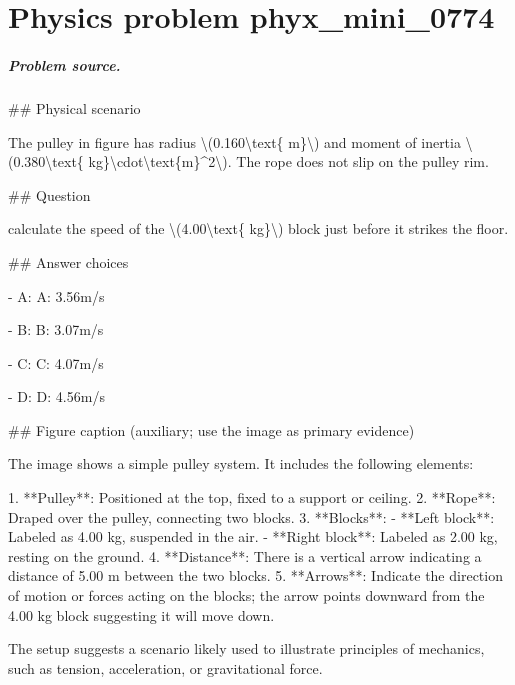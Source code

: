 
\chapter{Physics problem phyx\_mini\_0774}
\label{ch:PhyXMiniProblems_problem_phyx_mini_0774}

\paragraph{Problem source.}
\#\# Physical scenario

The pulley in figure has radius \textbackslash{}(0.160\textbackslash{}text\{ m\}\textbackslash{}) and moment of inertia \textbackslash{}(0.380\textbackslash{}text\{ kg\}\textbackslash{}cdot\textbackslash{}text\{m\}\textasciicircum{}2\textbackslash{}). The rope does not slip on the pulley rim.

\#\# Question

calculate the speed of the \textbackslash{}(4.00\textbackslash{}text\{ kg\}\textbackslash{}) block just before it strikes the floor.

\#\# Answer choices

- A: A: 3.56m/s

- B: B: 3.07m/s

- C: C: 4.07m/s

- D: D: 4.56m/s

\#\# Figure caption (auxiliary; use the image as primary evidence)

The image shows a simple pulley system. It includes the following elements:

1. **Pulley**: Positioned at the top, fixed to a support or ceiling.
2. **Rope**: Draped over the pulley, connecting two blocks.
3. **Blocks**:
   - **Left block**: Labeled as 4.00 kg, suspended in the air.
   - **Right block**: Labeled as 2.00 kg, resting on the ground.
4. **Distance**: There is a vertical arrow indicating a distance of 5.00 m between the two blocks.
5. **Arrows**: Indicate the direction of motion or forces acting on the blocks; the arrow points downward from the 4.00 kg block suggesting it will move down. 

The setup suggests a scenario likely used to illustrate principles of mechanics, such as tension, acceleration, or gravitational force.

